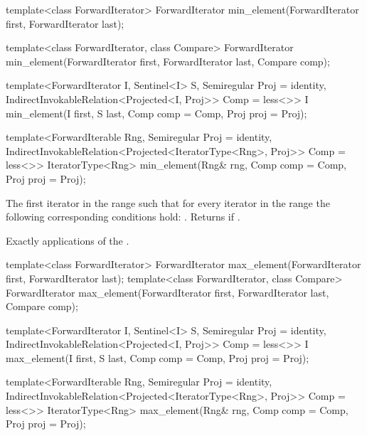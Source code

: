 %
\begin{removedblock}
\begin{itemdecl}
template<class ForwardIterator>
  ForwardIterator min_element(ForwardIterator first, ForwardIterator last);

template<class ForwardIterator, class Compare>
  ForwardIterator min_element(ForwardIterator first, ForwardIterator last,
                            Compare comp);
\end{itemdecl}
\end{removedblock}
\begin{addedblock}
\begin{itemdecl}
template<ForwardIterator I, Sentinel<I> S, Semiregular Proj = identity,
    IndirectInvokableRelation<Projected<I, Proj>> Comp = less<>>
  I min_element(I first, S last, Comp comp = Comp{}, Proj proj = Proj{});

template<ForwardIterable Rng, Semiregular Proj = identity,
    IndirectInvokableRelation<Projected<IteratorType<Rng>, Proj>> Comp = less<>>
  IteratorType<Rng>
    min_element(Rng& rng, Comp comp = Comp{}, Proj proj = Proj{});
\end{itemdecl}
\end{addedblock}

\begin{itemdescr}
\pnum
\returns
The first iterator
in the range
such that for every iterator
in the range
the following corresponding conditions hold:
.
Returns
if
.

\pnum
\complexity
Exactly
applications of the .
\end{itemdescr}

%
\begin{removedblock}
\begin{itemdecl}
template<class ForwardIterator>
  ForwardIterator max_element(ForwardIterator first, ForwardIterator last);
template<class ForwardIterator, class Compare>
  ForwardIterator max_element(ForwardIterator first, ForwardIterator last,
                            Compare comp);
\end{itemdecl}
\end{removedblock}
\begin{addedblock}
\begin{itemdecl}
template<ForwardIterator I, Sentinel<I> S, Semiregular Proj = identity,
    IndirectInvokableRelation<Projected<I, Proj>> Comp = less<>>
  I max_element(I first, S last, Comp comp = Comp{}, Proj proj = Proj{});

template<ForwardIterable Rng, Semiregular Proj = identity,
    IndirectInvokableRelation<Projected<IteratorType<Rng>, Proj>> Comp = less<>>
  IteratorType<Rng>
    max_element(Rng& rng, Comp comp = Comp{}, Proj proj = Proj{});
\end{itemdecl}
\end{addedblock}


